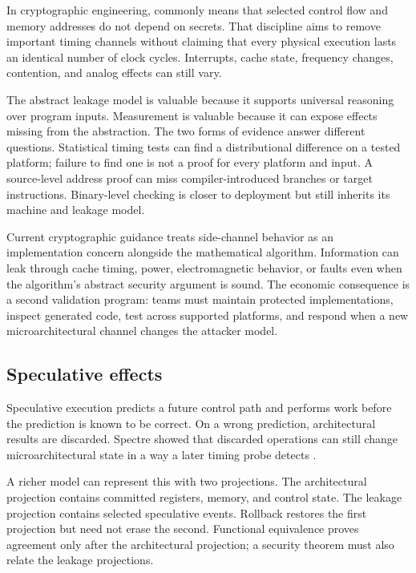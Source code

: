 In cryptographic engineering,  commonly means that
selected control flow and memory addresses do not depend on secrets. That
discipline aims to remove important timing channels without claiming that
every physical execution lasts an identical number of clock cycles. Interrupts,
cache state, frequency changes, contention, and analog effects can still vary.

The abstract leakage model is valuable because it supports universal reasoning
over program inputs. Measurement is valuable because it can expose effects
missing from the abstraction. The two forms of evidence answer different
questions. Statistical timing tests can find a distributional difference on a
tested platform; failure to find one is not a proof for every platform and
input. A source-level address proof can miss compiler-introduced branches or
target instructions. Binary-level checking is closer to deployment but still
inherits its machine and leakage model.

Current cryptographic guidance treats side-channel behavior as an
implementation concern alongside the mathematical algorithm. Information can
leak through cache timing, power, electromagnetic behavior, or faults even
when the algorithm's abstract security argument is sound. The economic
consequence is a second validation program: teams must maintain protected
implementations, inspect generated code, test across supported platforms, and
respond when a new microarchitectural channel changes the attacker model.

\subsection{Speculative effects}

Speculative execution predicts a future control path and performs work before
the prediction is known to be correct. On a wrong prediction, architectural
results are discarded. Spectre showed that discarded operations can still
change microarchitectural state in a way a later timing probe detects
\autocite{kocher2019spectre}.

A richer model can represent this with two projections. The architectural
projection contains committed registers, memory, and control state. The
leakage projection contains selected speculative events. Rollback restores the
first projection but need not erase the second. Functional equivalence proves
agreement only after the architectural projection; a security theorem must
also relate the leakage projections.

